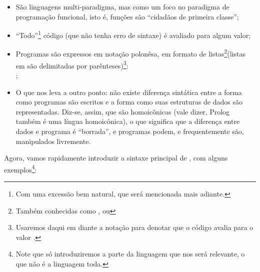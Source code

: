 \documentclass{article}
\begin{document}
\begin{itemize}
\item São linguagens multi-paradigma, mas como um
  foco no paradigma de programação funcional, isto é,
  funções são ``cidadãos de primeira classe'';
\item ``Todo''\footnote{Com uma excessão bem
    natural, que será mencionada mais adiante.} código
   (que não tenha erro de sintaxe) é avaliado para
  algum valor;
\item Programas são expressos em notação polonêsa, em formato de
  listas\footnote{Também conhecidas como , ou
    }(listas em  são delimitadas por
  parênteses)\footnote{Usaremos daqui em diante a notação
     para denotar que o código
     avalia para o valor .}:
  \\
   ;
\item O que nos leva a outro ponto: não existe diferença
  sintática entre a forma como programas  são escritos
  e a forma como suas estruturas de dados são representadas. Diz-se,
  assim, que  são homoicônicas (vale dizer, Prolog
  também é uma língua homoicônica), o que significa que a diferença
  entre dados e programa é ``borrada'', e programas podem, e
  frequentemente são, manipulados livremente.
\end{itemize}

Agora, vamos rapidamente introduzir a sintaxe principal de
, com alguns exemplos\footnote{Note que só
  introduziremos a parte da linguagem que nos será relevante, o que
  não é a linguagem toda.}:
\end{document}
